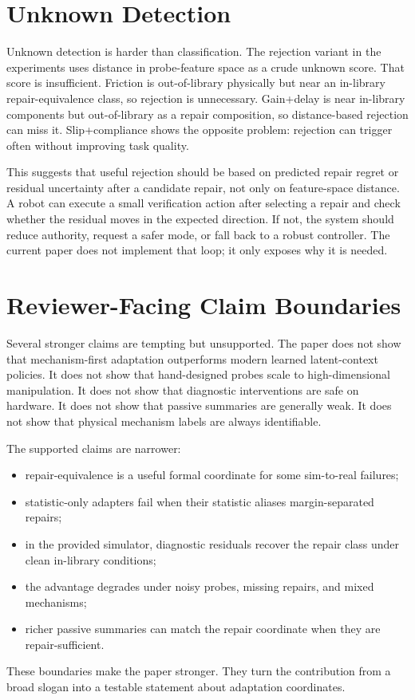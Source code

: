 \documentclass{article}
\begin{document}
\section{Unknown Detection}

Unknown detection is harder than classification. The rejection variant in the
experiments uses distance in probe-feature space as a crude unknown score. That
score is insufficient. Friction is out-of-library physically but near an
in-library repair-equivalence class, so rejection is unnecessary. Gain+delay is
near in-library components but out-of-library as a repair composition, so
distance-based rejection can miss it. Slip+compliance shows the opposite
problem: rejection can trigger often without improving task quality.

This suggests that useful rejection should be based on predicted repair regret
or residual uncertainty after a candidate repair, not only on feature-space
distance. A robot can execute a small verification action after selecting a
repair and check whether the residual moves in the expected direction. If not,
the system should reduce authority, request a safer mode, or fall back to a
robust controller. The current paper does not implement that loop; it only
exposes why it is needed.

\section{Reviewer-Facing Claim Boundaries}

Several stronger claims are tempting but unsupported. The paper does not show
that mechanism-first adaptation outperforms modern learned latent-context
policies. It does not show that hand-designed probes scale to high-dimensional
manipulation. It does not show that diagnostic interventions are safe on
hardware. It does not show that passive summaries are generally weak. It does
not show that physical mechanism labels are always identifiable.

The supported claims are narrower:
\begin{itemize}
    \item repair-equivalence is a useful formal coordinate for some sim-to-real
    failures;
    \item statistic-only adapters fail when their statistic aliases
    margin-separated repairs;
    \item in the provided simulator, diagnostic residuals recover the repair
    class under clean in-library conditions;
    \item the advantage degrades under noisy probes, missing repairs, and mixed
    mechanisms;
    \item richer passive summaries can match the repair coordinate when they are
    repair-sufficient.
\end{itemize}
These boundaries make the paper stronger. They turn the contribution from a
broad slogan into a testable statement about adaptation coordinates.
\end{document}
